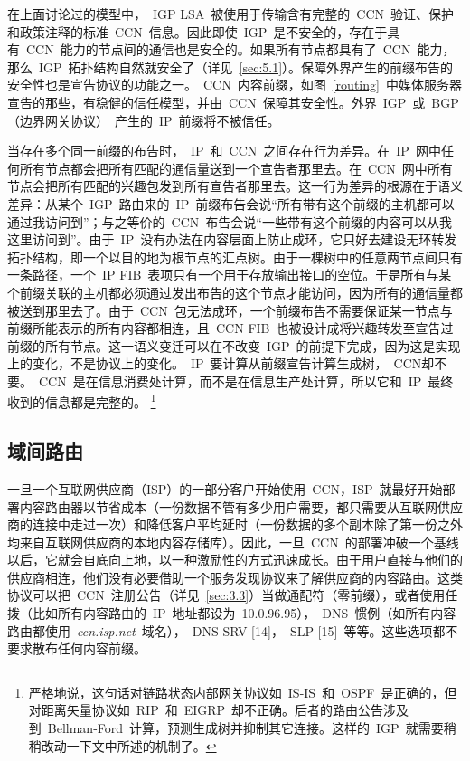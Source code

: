 在上面讨论过的模型中，~IGP LSA~被使用于传输含有完整的~CCN~验证、保护和政策注释的标准~CCN~信息。因此即使~IGP~是不安全的，存在于具有~CCN~能力的节点间的通信也是安全的。如果所有节点都具有了~CCN~能力，那么~IGP~拓扑结构自然就安全了（详见~\ref{sec:5.1}）。保障外界产生的前缀布告的安全性也是宣告协议的功能之一。~CCN~内容前缀，如图~\ref{routing}~中媒体服务器宣告的那些，有稳健的信任模型，并由~CCN~保障其安全性。外界~IGP~或~BGP（边界网关协议）~产生的~IP~前缀将不被信任。

当存在多个同一前缀的布告时，~IP~和~CCN~之间存在行为差异。在~IP~网中任何所有节点都会把所有匹配的通信量送到一个宣告者那里去。在~CCN~网中所有节点会把所有匹配的兴趣包发到所有宣告者那里去。这一行为差异的根源在于语义差异：从某个~IGP~路由来的~IP~前缀布告会说“所有带有这个前缀的主机都可以通过我访问到”；与之等价的~CCN~布告会说“一些带有这个前缀的内容可以从我这里访问到”。由于~IP~没有办法在内容层面上防止成环，它只好去建设无环转发拓扑结构，即一个以目的地为根节点的汇点树。由于一棵树中的任意两节点间只有一条路径，一个~IP FIB~表项只有一个用于存放输出接口的空位。于是所有与某个前缀关联的主机都必须通过发出布告的这个节点才能访问，因为所有的通信量都被送到那里去了。由于~CCN~包无法成环，一个前缀布告不需要保证某一节点与前缀所能表示的所有内容都相连，且~CCN FIB~也被设计成将兴趣转发至宣告过前缀的所有节点。这一语义变迁可以在不改变~IGP~的前提下完成，因为这是实现上的变化，不是协议上的变化。~IP~要计算从前缀宣告计算生成树，~CCN却不要。~CCN~是在信息消费处计算，而不是在信息生产处计算，所以它和~IP~最终收到的信息都是完整的。
\renewcommand\baselinestretch{1} %
\footnote{严格地说，这句话对链路状态内部网关协议如~IS-IS~和~OSPF~是正确的，但对距离矢量协议如~RIP~和~EIGRP~却不正确。后者的路由公告涉及到~Bellman-Ford~计算，预测生成树并抑制其它连接。这样的~IGP~就需要稍稍改动一下文中所述的机制了。}

\subsection{域间路由}
\label{sec:4.2}
一旦一个互联网供应商（ISP）的一部分客户开始使用~CCN，ISP~就最好开始部署内容路由器以节省成本（一份数据不管有多少用户需要，都只需要从互联网供应商的连接中走过一次）和降低客户平均延时（一份数据的多个副本除了第一份之外均来自互联网供应商的本地内容存储库）。因此，一旦~CCN~的部署冲破一个基线以后，它就会自底向上地，以一种激励性的方式迅速成长。由于用户直接与他们的供应商相连，他们没有必要借助一个服务发现协议来了解供应商的内容路由。这类协议可以把~CCN~注册公告（详见~\ref{sec:3.3}）当做通配符（零前缀），或者使用任拨（比如所有内容路由的~IP~地址都设为~10.0.96.95），~DNS~惯例（如所有内容路由都使用~\emph{ccn.isp.net}~域名），~DNS SRV [14]，~SLP [15]~等等。这些选项都不要求散布任何内容前缀。


